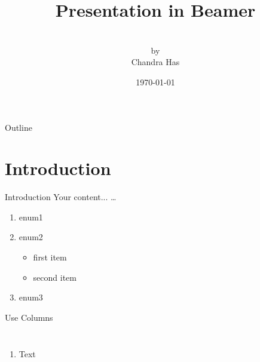 \documentclass[12pt]{beamer}
\begin{document}
\author[Chandra Has]{\\[5mm]\scriptsize by \\[5mm] \LARGE \color{magenta} Chandra Has}
\title{Presentation in Beamer}
\date{\today} 

\begin{frame}
\titlepage
\end{frame}


\section[Outline]{}
\begin{frame}{Outline}
\tableofcontents
\end{frame}


\section{Introduction}
\begin{frame}{Introduction}
Your content... \ldots
\begin{enumerate}
\item enum1
\item enum2
\begin{itemize}\setlength{\itemsep}{1cm}
\item first item
\item second item
\end{itemize}
\item enum3
\end{enumerate}


\end{frame}
\begin{frame}{Use Columns}
\begin{columns}[c]
\column{2in}
\begin{enumerate}
\item Text
\end{enumerate}
\column{5in}
 \end{columns}
\end{frame}
\end{document}
